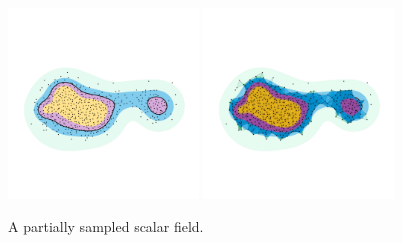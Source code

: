 \begin{figure}[htbp]
  \centering
  \includegraphics[trim=0 500 0 500, clip, width=0.45\textwidth]{figures/samples/samples_comp.pdf}
  \includegraphics[trim=0 500 0 500, clip, width=0.45\textwidth]{figures/samples/scalar1_comp.pdf}
  \caption{A partially sampled scalar field.}\label{fig:main}
\end{figure}

